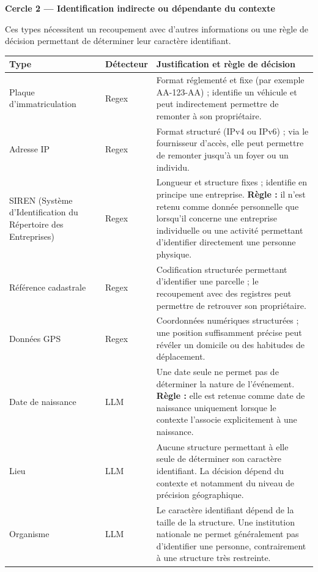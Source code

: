 \documentclass[12pt,a4paper]{article}
\begin{document}
\medskip
\noindent\textbf{Cercle 2 --- Identification indirecte ou dépendante du contexte}

\smallskip

Ces types nécessitent un recoupement avec d'autres informations ou une règle
de décision permettant de déterminer leur caractère identifiant.

\begin{longtable}{
    p{3.2cm}
    @{\hspace{0.4cm}}
    p{1.8cm}
    @{\hspace{0.4cm}}
    p{8.5cm}
}
\toprule
\textbf{Type} & \textbf{Détecteur} & \textbf{Justification et règle de décision} \\
\midrule
\endhead

Plaque d'immatriculation
& Regex
& Format réglementé et fixe (par exemple AA-123-AA) ; identifie un véhicule
et peut indirectement permettre de remonter à son propriétaire. \\

Adresse IP
& Regex
& Format structuré (IPv4 ou IPv6) ; via le fournisseur d'accès, elle peut
permettre de remonter jusqu'à un foyer ou un individu. \\

SIREN (Système d’Identification du Répertoire des Entreprises)
& Regex
& Longueur et structure fixes ; identifie en principe une entreprise.
\textbf{Règle :} il n'est retenu comme donnée personnelle que lorsqu'il
concerne une entreprise individuelle ou une activité permettant d'identifier
directement une personne physique. \\

Référence cadastrale
& Regex
& Codification structurée permettant d'identifier une parcelle ; le
recoupement avec des registres peut permettre de retrouver son propriétaire. \\

Données GPS
& Regex
& Coordonnées numériques structurées ; une position suffisamment précise
peut révéler un domicile ou des habitudes de déplacement. \\

Date de naissance
& LLM
& Une date seule ne permet pas de déterminer la nature de l'événement.
\textbf{Règle :} elle est retenue comme date de naissance uniquement lorsque
le contexte l'associe explicitement à une naissance. \\

Lieu
& LLM
& Aucune structure permettant à elle seule de déterminer son caractère
identifiant. La décision dépend du contexte et notamment du niveau de
précision géographique. \\

Organisme
& LLM
& Le caractère identifiant dépend de la taille de la structure. Une
institution nationale ne permet généralement pas d'identifier une personne,
contrairement à une structure très restreinte. \\

\bottomrule
\end{longtable}
\end{document}
